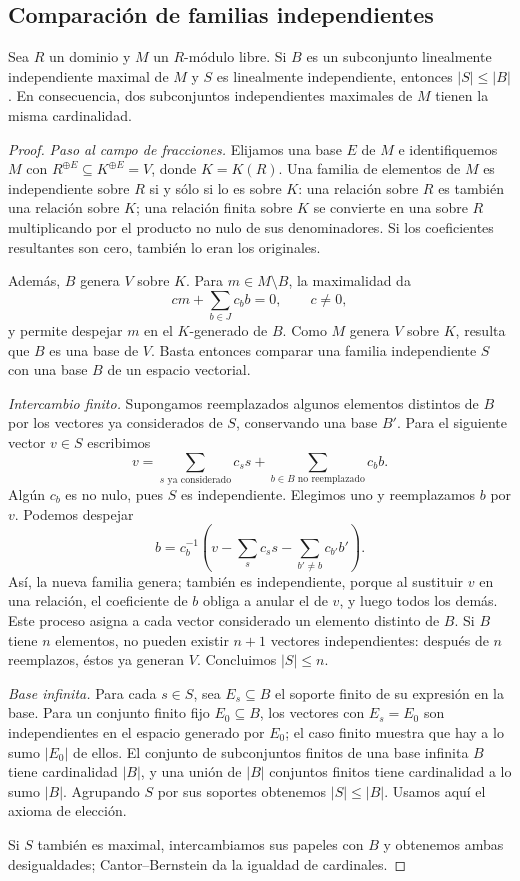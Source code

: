 \subsection{Comparación de familias independientes}
\begin{prop}\label{prop:C20-cardinal}
Sea $R$ un dominio y $M$ un $R$-módulo libre. Si $B$ es un subconjunto linealmente independiente maximal de $M$ y $S$ es linealmente independiente, entonces $|S|\leq|B|$. En consecuencia, dos subconjuntos independientes maximales de $M$ tienen la misma cardinalidad.
\end{prop}
\begin{proof}
\emph{Paso al campo de fracciones.} Elijamos una base $E$ de $M$ e identifiquemos $M$ con $R^{\oplus E}\subseteq K^{\oplus E}=V$, donde $K=K(R)$. Una familia de elementos de $M$ es independiente sobre $R$ si y sólo si lo es sobre $K$: una relación sobre $R$ es también una relación sobre $K$; una relación finita sobre $K$ se convierte en una sobre $R$ multiplicando por el producto no nulo de sus denominadores. Si los coeficientes resultantes son cero, también lo eran los originales.

Además, $B$ genera $V$ sobre $K$. Para $m\in M\setminus B$, la maximalidad da
\[
cm+\sum_{b\in J}c_bb=0,\qquad c\ne0,
\]
y permite despejar $m$ en el $K$-generado de $B$. Como $M$ genera $V$ sobre $K$, resulta que $B$ es una base de $V$. Basta entonces comparar una familia independiente $S$ con una base $B$ de un espacio vectorial.

\emph{Intercambio finito.} Supongamos reemplazados algunos elementos distintos de $B$ por los vectores ya considerados de $S$, conservando una base $B'$. Para el siguiente vector $v\in S$ escribimos
\[
v=\sum_{s\text{ ya considerado}}c_ss
  +\sum_{b\in B\text{ no reemplazado}}c_bb.
\]
Algún $c_b$ es no nulo, pues $S$ es independiente. Elegimos uno y reemplazamos $b$ por $v$. Podemos despejar
\[
b=c_b^{-1}\left(v-\sum_s c_ss-\sum_{b'\ne b}c_{b'}b'\right).
\]
Así, la nueva familia genera; también es independiente, porque al sustituir $v$ en una relación, el coeficiente de $b$ obliga a anular el de $v$, y luego todos los demás. Este proceso asigna a cada vector considerado un elemento distinto de $B$. Si $B$ tiene $n$ elementos, no pueden existir $n+1$ vectores independientes: después de $n$ reemplazos, éstos ya generan $V$. Concluimos $|S|\leq n$.

\emph{Base infinita.} Para cada $s\in S$, sea $E_s\subseteq B$ el soporte finito de su expresión en la base. Para un conjunto finito fijo $E_0\subseteq B$, los vectores con $E_s=E_0$ son independientes en el espacio generado por $E_0$; el caso finito muestra que hay a lo sumo $|E_0|$ de ellos. El conjunto de subconjuntos finitos de una base infinita $B$ tiene cardinalidad $|B|$, y una unión de $|B|$ conjuntos finitos tiene cardinalidad a lo sumo $|B|$. Agrupando $S$ por sus soportes obtenemos $|S|\leq|B|$. Usamos aquí el axioma de elección.

Si $S$ también es maximal, intercambiamos sus papeles con $B$ y obtenemos ambas desigualdades; Cantor--Bernstein da la igualdad de cardinales.
\end{proof}

